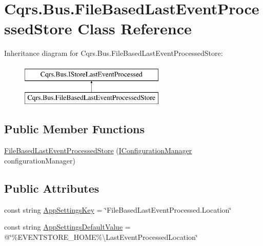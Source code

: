 \hypertarget{classCqrs_1_1Bus_1_1FileBasedLastEventProcessedStore}{}\section{Cqrs.\+Bus.\+File\+Based\+Last\+Event\+Processed\+Store Class Reference}
\label{classCqrs_1_1Bus_1_1FileBasedLastEventProcessedStore}
Inheritance diagram for Cqrs.\+Bus.\+File\+Based\+Last\+Event\+Processed\+Store\+:\begin{figure}[H]
\begin{center}
\leavevmode
\includegraphics[height=2.000000cm]{classCqrs_1_1Bus_1_1FileBasedLastEventProcessedStore}
\end{center}
\end{figure}
\subsection*{Public Member Functions}
\begin{DoxyCompactItemize}
\item 
\hyperlink{classCqrs_1_1Bus_1_1FileBasedLastEventProcessedStore_a9e7f5bb54ffc9970f57e1712e9008e8a_a9e7f5bb54ffc9970f57e1712e9008e8a}{File\+Based\+Last\+Event\+Processed\+Store} (\hyperlink{interfaceCqrs_1_1Configuration_1_1IConfigurationManager}{I\+Configuration\+Manager} configuration\+Manager)
\end{DoxyCompactItemize}
\subsection*{Public Attributes}
\begin{DoxyCompactItemize}
\item 
const string \hyperlink{classCqrs_1_1Bus_1_1FileBasedLastEventProcessedStore_ab7387488772c28f22cfb276f4f0b3adb_ab7387488772c28f22cfb276f4f0b3adb}{App\+Settings\+Key} = \char`\"{}File\+Based\+Last\+Event\+Processed.\+Location\char`\"{}
\item 
const string \hyperlink{classCqrs_1_1Bus_1_1FileBasedLastEventProcessedStore_ab72de68ea94158dfa1c00ea697d84968_ab72de68ea94158dfa1c00ea697d84968}{App\+Settings\+Default\+Value} = @\char`\"{}\%E\+V\+E\+N\+T\+S\+T\+O\+R\+E\+\_\+\+H\+O\+ME\%\textbackslash{}Last\+Event\+Processed\+Location\char`\"{}
\end{DoxyCompactItemize}
